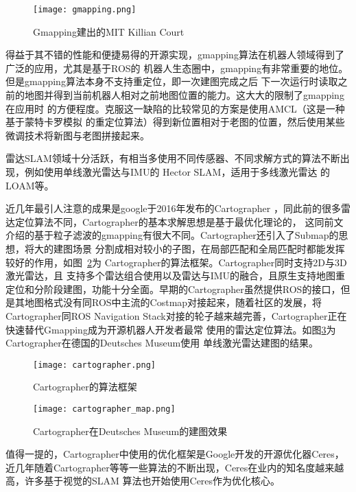 \begin{figure}
  \centering
  \texttt{[image: gmapping.png]}
  \caption{Gmapping建出的MIT Killian Court}
  \label{fig:gmapping}
\end{figure}

得益于其不错的性能和便捷易得的开源实现，gmapping算法在机器人领域得到了广泛的应用，尤其是基于ROS的
机器人生态圈中，gmapping有非常重要的地位。但是gmapping算法本身不支持重定位，即一次建图完成之后
下一次运行时读取之前的地图并得到当前机器人相对之前地图位置的能力。这大大的限制了gmapping在应用时
的方便程度。克服这一缺陷的比较常见的方案是使用AMCL\cite{fox2002kld}（这是一种基于蒙特卡罗模拟
的重定位算法）得到新位置相对于老图的位置，然后使用某些微调技术将新图与老图拼接起来。

雷达SLAM领域十分活跃，有相当多使用不同传感器、不同求解方式的算法不断出现，例如使用单线激光雷达与IMU的
Hector SLAM\cite{KohlbrecherMeyerStrykKlingaufFlexibleSlamSystem2011}，适用于多线激光雷达
的LOAM\cite{zhang2014loam}等。

近几年最引人注意的成果是google于2016年发布的Cartographer
\cite{hess2016real}，同此前的很多雷达定位算法不同，Cartographer的基本求解思想是基于最优化理论的，
这同前文介绍的基于粒子滤波的gmapping有很大不同。Cartographer还引入了Submap的思想，将大的建图场景
分割成相对较小的子图，在局部匹配和全局匹配时都能发挥较好的作用，如图~\ref{fig:cartographer}为
Cartographer的算法框架。Cartographer同时支持2D与3D激光雷达，且
支持多个雷达组合使用以及雷达与IMU的融合，且原生支持地图重定位和分阶段建图，功能十分全面。早期的Cartographer虽然提供ROS的接口，但是其地图格式没有同ROS中主流的Costmap对接起来，随着社区的发展，将Cartographer同ROS
Navigation Stack对接的轮子越来越完善，Cartographer正在快速替代Gmapping成为开源机器人开发者最常
使用的雷达定位算法。如图\ref{fig:cartographer_map}为Cartographer在德国的Deutsches Museum使用
单线激光雷达建图的结果。

\begin{figure}[h] %
  \centering
  \texttt{[image: cartographer.png]}
  \caption{Cartographer的算法框架}
  \label{fig:cartographer}
\end{figure}

\begin{figure}
  \centering
  \texttt{[image: cartographer\_map.png]}
  \caption{Cartographer在Deutsches Museum的建图效果}
  \label{fig:cartographer_map}
\end{figure}



值得一提的，Cartographer中使用的优化框架是Google开发的开源优化器Ceres\cite{ceres-solver}，
近几年随着Cartographer等等一些算法的不断出现，Ceres在业内的知名度越来越高，许多基于视觉的SLAM
算法也开始使用Ceres作为优化核心。

